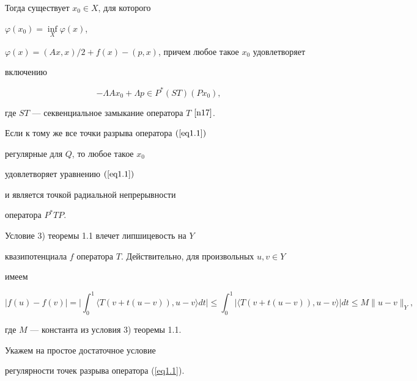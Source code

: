 \begin{thms}
\begin{itemize}
\end{itemize}


Тогда существует $x_0 \in X$, для которого


$\varphi(x_0)=\inf\limits_X \varphi(x)$,


$\varphi(x) =(Ax,x)/2+f(x)-(p,x)$, причем любое такое $x_0$ удовлетворяет


включению


\begin{equation}


- \Lambda Ax_0+ \Lambda p \in P^*(ST)(Px_0),


\label{eq1.4}


\end{equation}


где $ST$ --- секвенциальное замыкание оператора $T$ $\cite{n17}$.


Если к тому же все точки разрыва оператора $(\ref{eq1.1})$


регулярные для $Q$, то любое такое $x_0$


удовлетворяет уравнению $(\ref{eq1.1})$


и является точкой радиальной непрерывности


оператора $P^*TP$.


\end{thms}





\begin{notes}


Условие 3) теоремы 1.1 влечет липшицевость на $Y$


квазипотенциала $f$ оператора $T$. Действительно, для произвольных $u,v \in Y$


имеем


$$


|f(u)-f(v)|=\bigg|\int_0^1 \langle T(v+t(u-v)),u-v \rangle dt\bigg|\le


\int_0^1 |\langle T(v+t(u-v)),u-v \rangle |dt \le M\|u-v\|_Y,


$$


где $M$ --- константа из условия 3) теоремы 1.1.


\end{notes}





Укажем на простое достаточное условие


регулярности точек разрыва оператора (\ref{eq1.1}).





